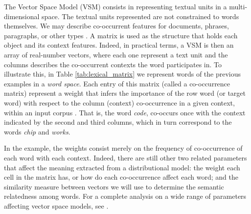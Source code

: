 The Vector Space Model (VSM) consists in representing textual units in a multi-dimensional space. The textual units represented are not constrained to words themselves. We may describe co-occurrent features for documents, phrases, paragraphs, or other types \cite{manning1999foundations}. A matrix is used as the structure that holds each object and its context features. Indeed, in practical terms, a VSM is then an array of real-number vectors, where each one represent a text unit and the columns describes the co-occurrent contexts the word participates in. To illustrate  this, in Table \ref{tab:lexical_matrix} we represent words of the previous examples in a \textit{word space}. Each entry of this matrix (called a co-occurrence matrix) represent a weight that infers the importance of the row word (or target word) with respect to the column (context) co-occurrence in a given context, within an input corpus \cite{JurafskyM09}. That is, the word \textit{code}, co-occurs once with the context indicated by the second and third columns, which in turn correspond to the words \textit{chip} and \textit{works}.

In the example, the weights consist merely on the frequency of co-occurrence of each word with each context. Indeed, there are still other two related parameters that affect the meaning extracted from a distributional model: the weight each cell in the matrix has, or how do each co-occurrence affect each word; and the similarity measure  between vectors we will use to determine the semantic relatedness among words. For a complete analysis on a wide range of parameters affecting vector space models, see \cite{baroni2010distributional,kiela2014systematic,levy2015improving}.



